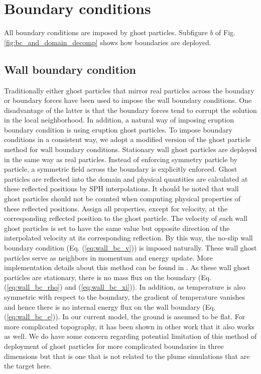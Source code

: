 \section{Boundary conditions}
All boundary conditions are imposed by ghost particles. Subfigure $b$ of Fig. \ref{fig:bc_and_domain_decomp} shows how boundaries are deployed. 
\subsection{Wall boundary condition}
Traditionally either ghost particles that mirror real particles across the boundary \citep {ferrari2009new} or boundary forces \citep {monaghan2009sph} have been used to impose the wall boundary conditions. One disadvantage of the latter  is that the boundary forces tend to corrupt the solution in the local neighborhood. In addition, a natural way of imposing eruption boundary condition is using eruption ghost particles. To impose boundary conditions in a consistent way, we adopt a modified version of the ghost particle method \citep {kumar2013parallel} for wall boundary conditions. Stationary wall ghost particles are deployed in the same way as real particles. Instead of enforcing symmetry particle by particle, a symmetric field across the boundary is explicitly enforced. Ghost particles are reflected into the domain and physical quantities are calculated at these reflected positions by SPH interpolations. It should be noted that wall ghost particles should not be counted when computing physical properties of these reflected positions. Assign all properties, except for velocity, at the corresponding reflected position to the ghost particle. The velocity of each wall ghost particles is set to have the same value but opposite direction of the interpolated velocity at its corresponding reflection. By this way, the no-slip wall boundary condition (Eq. (\ref{eq:wall_bc_v})) is imposed naturally. These wall ghost particles serve as neighbors in momentum and energy update. More implementation details about this method can be found in \citep {kumar2013parallel}. As these wall ghost particles are stationary, there is no mass flux on the boundary (Eq. (\ref{eq:wall_bc_rho}) and (\ref{eq:wall_bc_xi})). In addition, as temperature is also symmetric with respect to the boundary, the gradient of temperature vanishes and hence there is no internal energy flux on the wall boundary (Eq. (\ref{eq:wall_bc_e})). 
In our current model, the ground is assumed to be  flat. For more complicated topography, it has been shown in other work \citep {kumar2013parallel} that it also works as well. We do have some concern regarding potential limitation of this method of deployment of ghost particles for more complicated boundaries in three dimensions but that is one that is not related to the plume simulations that are the target here.

